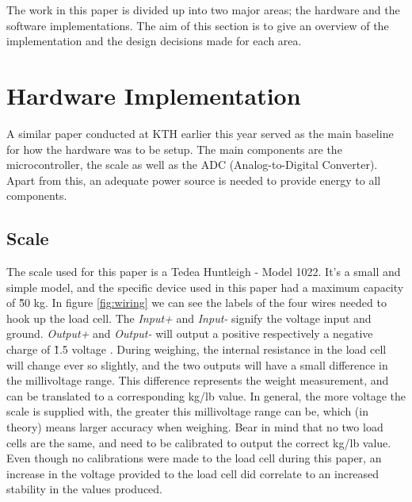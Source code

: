 




The work in this paper is divided up into two major areas; the hardware and the software implementations. The aim of this section is to give an overview of the implementation and the design decisions made for each area.

\section{Hardware Implementation}

A similar paper conducted at KTH earlier this year served as the main baseline for how the hardware was to be setup.\cite{hospital} The main components are the microcontroller, the scale as well as the ADC (Analog-to-Digital Converter). Apart from this, an adequate power source is needed to provide energy to all components. 

\subsection{Scale}
The scale used for this paper is a Tedea Huntleigh - Model 1022. It's a small and simple model, and the specific device used in this paper had a maximum capacity of \~50 kg.\cite{load-cell-data} In figure \ref{fig:wiring} we can see the labels of the four wires needed to hook up the load cell. The \textit{Input+} and \textit{Input-} signify the voltage input and ground. \cite{load-cell-spec} \textit{Output+} and \textit{Output-} will output a positive respectively a negative charge of \~1.5 voltage . During weighing, the internal resistance in the load cell will change ever so slightly, and the two outputs will have a small difference in the millivoltage range. This difference represents the weight measurement, and can be translated to a corresponding kg/lb value. In general, the more voltage the scale is supplied with, the greater this millivoltage range can be, which (in theory) means larger accuracy when weighing. Bear in mind that no two load cells are the same, and need to be calibrated to output the correct kg/lb value. Even though no calibrations were made to the load cell during this paper, an increase in the voltage provided to the load cell did correlate to an increased stability in the values produced. 

